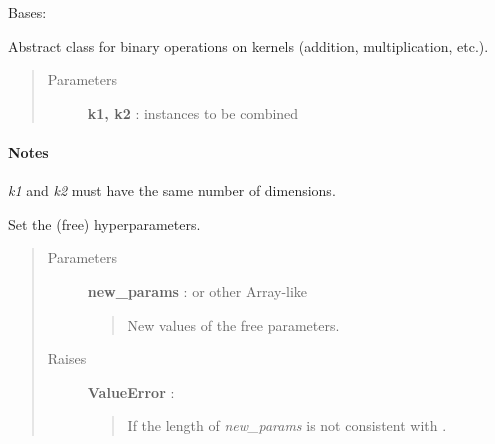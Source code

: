 \documentclass[letterpaper,10pt,english]{sphinxmanual}
\begin{document}
\begin{fulllineitems}
\label{gptools.kernel:gptools.kernel.core.BinaryKernel}
Bases: {\hyperref[gptools.kernel:gptools.kernel.core.Kernel]{}}

Abstract class for binary operations on kernels (addition, multiplication, etc.).
\begin{quote}\begin{description}
\item[{Parameters }] \leavevmode
\textbf{k1, k2} : {\hyperref[gptools.kernel:gptools.kernel.core.Kernel]{}} instances to be combined

\end{description}\end{quote}
\paragraph{Notes}

\emph{k1} and \emph{k2} must have the same number of dimensions.

\begin{fulllineitems}
\label{gptools.kernel:gptools.kernel.core.BinaryKernel.set_hyperparams}
Set the (free) hyperparameters.
\begin{quote}\begin{description}
\item[{Parameters }] \leavevmode
\textbf{new\_params} :  or other Array-like
\begin{quote}

New values of the free parameters.
\end{quote}

\item[{Raises }] \leavevmode
\textbf{ValueError} :
\begin{quote}

If the length of \emph{new\_params} is not consistent with .
\end{quote}

\end{description}\end{quote}

\end{fulllineitems}


\end{fulllineitems}
\end{document}
